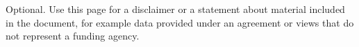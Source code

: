 Optional. Use this page for a disclaimer or a statement about material included in the document, for example data provided under an agreement or views that do not represent a funding agency.
